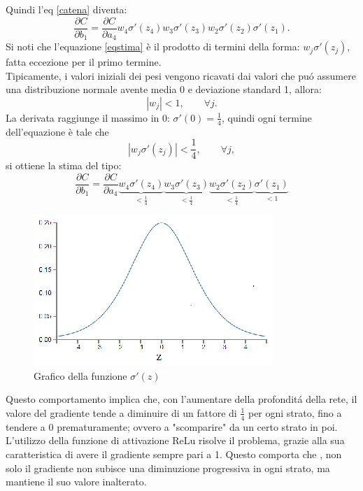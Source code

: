 \documentclass[a4paper,12pt,oneside]{book}
\begin{document}
Quindi l'eq \ref{catena} diventa:
\begin{equation}\label{eqstima}
\frac{\partial C}{\partial b_1}= \frac{\partial C}{\partial a_4} w_4 \sigma ' (z_4) w_3 \sigma ' (z_3) w_2 \sigma '(z_2) \sigma '(z_1).
\end{equation}
Si noti che l'equazione \ref{eqstima} \`e il prodotto di termini della forma: $w_j  \sigma '(z_j)$, fatta eccezione per il primo termine.\\
Tipicamente, i valori iniziali dei pesi vengono ricavati dai valori che pu\'{o} assumere una distribuzione normale avente media 0 e deviazione standard 1, allora: $$|w_j|<1,\qquad \forall j.$$
La derivata raggiunge il massimo in 0: $\sigma '(0)=\frac{1}{4}$, quindi ogni termine dell'equazione \`e tale che $$|w_j \sigma '(z_j)| < \frac{1}{4}, \qquad \forall j,$$ si ottiene la stima del tipo:
\begin{equation}
\frac{\partial C}{\partial b_1}= \frac{\partial C}{\partial a_4} \underbrace{w_4 \sigma '(z_4)}_{<\frac{1}{4}} \underbrace{w_3 \sigma '(z_3)}_{< \frac{1}{4}} \underbrace{w_2 \sigma '(z_2)}_{< \frac{1}{4}}\underbrace{\sigma '(z_1)}_{< 1} \nonumber
\end{equation}
\begin{figure}[!h]
\centering
\includegraphics[scale=2]{derivataSigmoid}
\caption{Grafico della funzione $\sigma '(z)$}
\end{figure}
\newpage
Questo comportamento implica che, con l'aumentare della profondit\'{a} della rete, il valore del gradiente tende a diminuire di un fattore di $\frac{1}{4}$ per ogni strato, fino a tendere a 0 prematuramente; ovvero a "scomparire" da un certo strato in poi.\\
L'utilizzo della funzione di attivazione ReLu risolve il problema, grazie alla sua caratteristica di avere il gradiente sempre pari a 1. Questo comporta che , non solo il gradiente non subisce una diminuzione progressiva in ogni strato, ma mantiene il suo valore inalterato.\\
\end{document}
